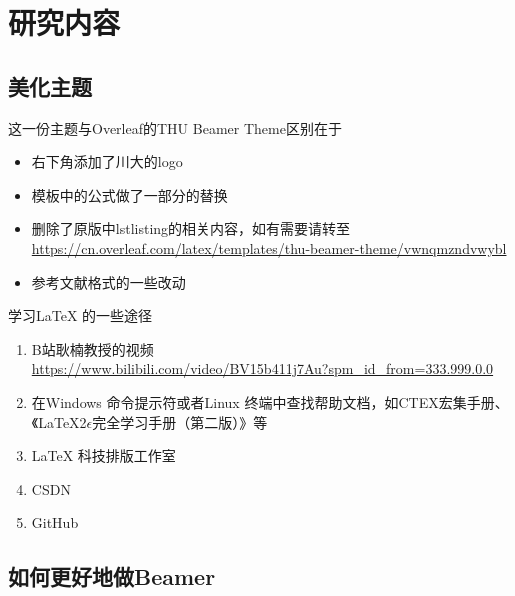 \documentclass{beamer}
\begin{document}
\section{研究内容}
\subsection{美化主题}

\begin{frame}{这一份主题与Overleaf的THU Beamer Theme区别在于}
	\begin{itemize}[<+->]
		\item 右下角添加了川大的logo
		\item 模板中的公式做了一部分的替换
		\item 删除了原版中lstlisting的相关内容，如有需要请转至 \\
		      \url{https://cn.overleaf.com/latex/templates/thu-beamer-theme/vwnqmzndvwybl}
		\item 参考文献格式的一些改动
	\end{itemize}
\end{frame}

\begin{frame}{学习\LaTeX{} 的一些途径}
	\begin{enumerate}[<+->]
		\item  B站耿楠教授的视频 \\ \url{https://www.bilibili.com/video/BV15b411j7Au?spm_id_from=333.999.0.0}
		\item  在Windows 命令提示符或者Linux 终端中查找帮助文档，如CTEX宏集手册、《LaTeX2$\epsilon$完全学习手册（第二版）》等
		\item  \LaTeX{} 科技排版工作室
		\item  CSDN
		\item  GitHub
	\end{enumerate}
\end{frame}

\subsection{如何更好地做Beamer}
\end{document}
